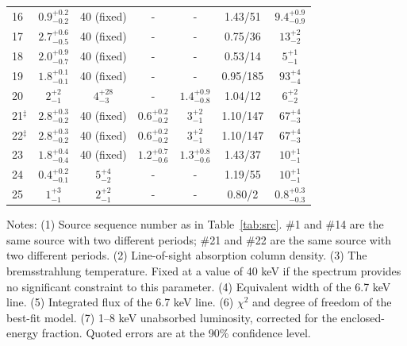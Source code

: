 \documentclass[fleqn,usenatbib]{mnras}
\begin{document}
\begin{table}
\begin{threeparttable}
\begin{spacing}{1.19}
\begin{tabular}{lcccccc}
16 & $0.9^{+0.2}_{-0.2}$ & 40 (fixed) & - &-&  1.43/51  & $9.4^{+0.9}_{-0.9}$
\\
17 & $2.7^{+0.6}_{-0.5}$ & 40 (fixed)  & - &-&  0.75/36 & $13^{+2}_{-2}$
\\
18 & $2.0^{+0.9}_{-0.7}$ & 40 (fixed)  & -&- &  0.53/14  & $5^{+1}_{-1}$
\\
19 & $1.8^{+0.1}_{-0.1}$ & 40 (fixed)  & - &- &  0.95/185  & $93^{+4}_{-4}$
\\
20 & $2^{+2}_{-1}$ & $4^{+28}_{-3}$ & - &$1.4^{+0.9}_{-0.8}$ & 1.04/12  & $6^{+2}_{-2}$
\\
21$^\ddag$ & $2.8^{+0.3}_{-0.2}$ & 40 (fixed)  & $0.6^{+0.2}_{-0.2}$& 
$3^{+2}_{-1}$ & 1.10/147  & $67^{+4}_{-3}$
\\
22$^\ddag$ & $2.8^{+0.3}_{-0.2}$ & 40 (fixed)  &  $0.6^{+0.2}_{-0.2}$ & $3^{+2}_{-1}$ & 1.10/147  & $67^{+4}_{-3}$
\\
23 & $1.8^{+0.4}_{-0.4}$ & 40 (fixed)  & $1.2^{+0.7}_{-0.6}$  & $1.3^{+0.8}_{-0.6}$ & 1.43/37  & $10^{+1}_{-1}$
\\
24 & $0.4^{+0.2}_{-0.1}$ & $5^{+4}_{-2}$ & - &-&  1.19/55  & 
$10^{+1}_{-1}$
\\
25 & $1^{+3}_{-1}$ & $2^{+2}_{-1}$ &-&-&  0.80/2 & $0.8^{+0.3}_{-0.3}$ 
\\
\hline
\end{tabular}
\end{spacing}
\begin{tablenotes}
      \small
      \item
      Notes: 
      (1) Source sequence number as in Table~\ref{tab:src}. {\dag}\#1 and \#14 are the same source with two different periods; {\ddag}\#21 and \#22 are the same source with two different periods. 
(2) Line-of-sight absorption column density.
(3) The bremsstrahlung temperature. Fixed at a value of 40 keV if the spectrum provides no significant constraint to this parameter.
 (4) Equivalent width of the 6.7 keV line.
 (5) Integrated flux of the 6.7 keV line.
 (6) $\chi^2$ and degree of freedom of the best-fit model.
 (7) 1--8 keV unabsorbed luminosity, corrected for the enclosed-energy fraction. Quoted errors are at the 90\% confidence level.
\end{tablenotes} 
\end{threeparttable}
\end{table} 
 
\end{document}
